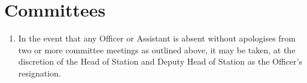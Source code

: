 \section{Committees}

\begin{enumerate}[label*=\thesection.\arabic*.,itemsep=3ex]
    
    
    
    
    
    
    \item In the event that any Officer or Assistant is absent without apologises from two or more committee meetings as outlined above, it may be taken, at the discretion of the Head of Station and Deputy Head of Station as the Officer's resignation.
\end{enumerate}
